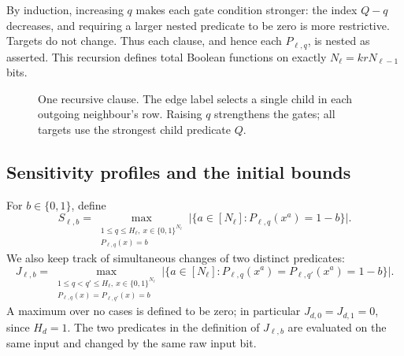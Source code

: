 \documentclass[11pt]{article}
\theoremstyle{definition}
\theoremstyle{remark}
\begin{document}
By induction, increasing \(q\) makes each gate condition stronger:
the index \(Q-q\) decreases, and requiring a larger nested predicate
to be zero is more restrictive. Targets do not change. Thus each
clause, and hence each \(P_{\ell,q}\), is nested as asserted.
This recursion defines total Boolean functions on exactly
\(N_\ell=krN_{\ell-1}\) bits.

\begin{figure}[htbp]
\centering
{}
\caption{One recursive clause. The edge label selects a single child in
each outgoing neighbour's row. Raising \(q\) strengthens the gates;
all targets use the strongest child predicate \(Q\).}
\label{fig:clause}
\end{figure}

\subsection{Sensitivity profiles and the initial bounds}
For \(b\in\{0,1\}\), define
\[
 S_{\ell,b}=\max_{\substack{1\le q\le H_\ell,\ x\in\{0,1\}^{N_\ell}\\
                           P_{\ell,q}(x)=b}}
 \bigl|\{a\in[N_\ell]:P_{\ell,q}(x^a)=1-b\}\bigr|.
\]
We also keep track of simultaneous changes of two distinct predicates:
\[
 J_{\ell,b}=\max_{\substack{1\le q<q'\le H_\ell,\ x\in\{0,1\}^{N_\ell}\\
                         P_{\ell,q}(x)=P_{\ell,q'}(x)=b}}
 \bigl|\{a\in[N_\ell]:P_{\ell,q}(x^a)=P_{\ell,q'}(x^a)=1-b\}\bigr|.
\]
A maximum over no cases is defined to be zero; in particular
\(J_{d,0}=J_{d,1}=0\), since \(H_d=1\).
The two predicates in the definition of \(J_{\ell,b}\) are evaluated
on the same input and changed by the same raw input bit.
\end{document}
